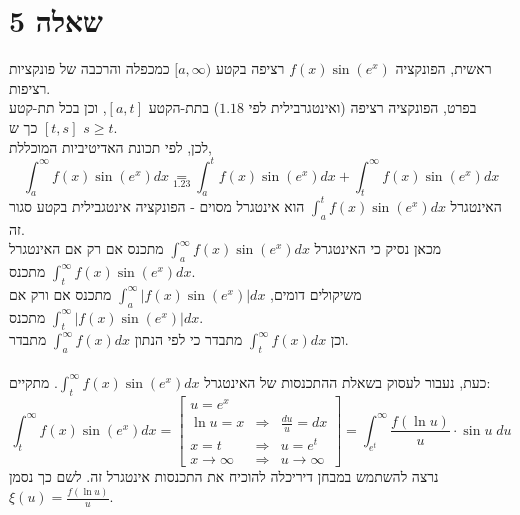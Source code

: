 \documentclass{article}
\newcommand\underrel[2]{\mathrel{\mathop{#2}\limits_{#1}}}
\begin{document}
\pagebreak

\section*{שאלה 5}

ראשית, הפונקציה
$f(x)\sin(e^x)$
רציפה בקטע $[a,\infty)$
כמכפלה והרכבה של פונקציות רציפות. \\
בפרט, הפונקציה רציפה (ואינטגרבילית לפי $1.18$) בתת-הקטע
$[a,t]$, וכן בכל תת-קטע $[t,s]$ כך ש $s \geq t$. \\
לכן, לפי תכונת האדיטיביות המוכללת,
\[
    \int_a^\infty f(x)\sin(e^x)dx \underrel{1.23}{=}
    \int_a^t f(x)\sin(e^x)dx + \int_t^\infty f(x)\sin(e^x)dx
\]
האינטגרל $\int_a^t f(x)\sin(e^x)dx$
הוא אינטגרל מסוים - הפונקציה אינטגבילית בקטע סגור זה. \\
מכאן נסיק כי האינטגרל $\int_a^\infty f(x)\sin(e^x)dx$
מתכנס אם רק אם האינטגרל $\int_t^\infty f(x)\sin(e^x)dx$ מתכנס. \\
משיקולים דומים, $\int_a^\infty |f(x)\sin(e^x)|dx$ מתכנס אם ורק אם $\int_t^\infty |f(x)\sin(e^x)|dx$ מתכנס. \\
וכן $\int_t^\infty f(x)dx$ מתבדר כי לפי הנתון $\int_a^\infty f(x)dx$ מתבדר.
\\\\
כעת, נעבור לעסוק בשאלת ההתכנסות של האינטגרל $\int_t^\infty f(x)\sin(e^x)dx$.
מתקיים:
\[
    \int_t^\infty f(x)\sin(e^x)dx =
    \begin{bmatrix}
        u=e^x                                                    \\
        \ln u = x           & \Rightarrow & \frac{du}{u} = dx    \\
        x = t               & \Rightarrow & u = e^t              \\
        x\rightarrow \infty & \Rightarrow & u \rightarrow \infty
    \end{bmatrix} =
    \int_{e^t}^\infty \frac{f(\ln u)}{u} \cdot \sin u \;du
\]
נרצה להשתמש במבחן דיריכלה להוכיח את התכנסות אינטגרל זה. לשם כך נסמן $\xi(u) = \frac{f(\ln u)}{u}$.
\end{document}
